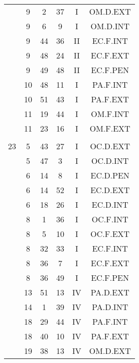 \documentclass[12pt, a4paper]{article}
\begin{document}
\begin{multicols}{3}
{\begin{tabular}{c c c c c c}
	 	 	 	 & 9 & 2 & 37 & I & OM.D.EXT\\%
	 	 	 	 & 9 & 6 & 9 & I & OM.D.INT\\%
	 	 	 	 & 9 & 44 & 36 & II & EC.F.INT\\%
	 	 	 	 & 9 & 48 & 24 & II & EC.F.EXT\\%
	 	 	 	 & 9 & 49 & 48 & II & EC.F.PEN\\%
	 	 	 	 & 10 & 48 & 11 & I & PA.F.INT\\%
	 	 	 	 & 10 & 51 & 43 & I & PA.F.EXT\\%
	 	 	 	 & 11 & 19 & 44 & I & OM.F.INT\\%
	 	 	 	 & 11 & 23 & 16 & I & OM.F.EXT\\%
	 	 	 	 & & & & & \\%
	 	 	 	23 & 5 & 43 & 27 & I & OC.D.EXT\\%
	 	 	 	 & 5 & 47 & 3 & I & OC.D.INT\\%
	 	 	 	 & 6 & 14 & 8 & I & EC.D.PEN\\%
	 	 	 	 & 6 & 14 & 52 & I & EC.D.EXT\\%
	 	 	 	 & 6 & 18 & 26 & I & EC.D.INT\\%
	 	 	 	 & 8 & 1 & 36 & I & OC.F.INT\\%
	 	 	 	 & 8 & 5 & 10 & I & OC.F.EXT\\%
	 	 	 	 & 8 & 32 & 33 & I & EC.F.INT\\%
	 	 	 	 & 8 & 36 & 7 & I & EC.F.EXT\\%
	 	 	 	 & 8 & 36 & 49 & I & EC.F.PEN\\%
	 	 	 	 & 13 & 51 & 13 & IV & PA.D.EXT\\%
	 	 	 	 & 14 & 1 & 39 & IV & PA.D.INT\\%
	 	 	 	 & 18 & 29 & 44 & IV & PA.F.INT\\%
	 	 	 	 & 18 & 40 & 10 & IV & PA.F.EXT\\%
	 	 	 	 & 19 & 38 & 13 & IV & OM.D.EXT\\%
	 	 \end{tabular}
 	}
\end{multicols}
\end{document}
